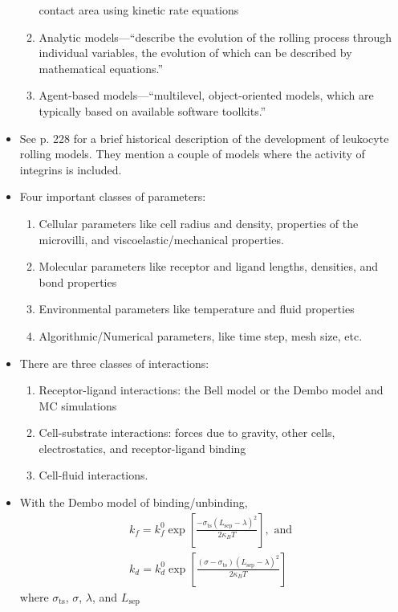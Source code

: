 \documentclass[
10pt, %
letterpaper, %
twocolumn, %
landscape %
]{article}
\begin{document}
\begin{itemize}
\begin{enumerate}
    contact area using kinetic rate equations
  \item Analytic models---``describe the evolution of the rolling
    process through individual variables, the evolution of which can
    be described by mathematical equations.''
  \item Agent-based models---``multilevel, object-oriented models,
    which are typically based on available software toolkits.''
  \end{enumerate}
\item See p. 228 for a brief historical description of the development
  of leukocyte rolling models. They mention a couple of models where
  the activity of integrins is included.
\item Four important classes of parameters:
  \begin{enumerate}
  \item Cellular parameters like cell radius and density, properties
    of the microvilli, and viscoelastic/mechanical properties.
  \item Molecular parameters like receptor and ligand lengths,
    densities, and bond properties
  \item Environmental parameters like temperature and fluid properties
  \item Algorithmic/Numerical parameters, like time step, mesh size, etc.
  \end{enumerate}
\item There are three classes of interactions:
  \begin{enumerate}
  \item Receptor-ligand interactions: the Bell model or the Dembo
    model and MC simulations
  \item Cell-substrate interactions: forces due to gravity, other cells,
    electrostatics, and receptor-ligand binding
  \item Cell-fluid interactions.
  \end{enumerate}
\item With the Dembo model of binding/unbinding, 
  \begin{align*}
    k_f = k_f^0 \exp\left[\frac{-\sigma_\text{ts} \left(L_\text{sep} -
    \lambda\right)^2}{2\kappa_B T}\right], \text{ and } \\
    k_d = k_d^0\exp\left[\frac{(\sigma -
    \sigma_\text{ts})\left(L_\text{sep} - \lambda\right)^2}{2\kappa_B
    T}\right]
  \end{align*}
  where $\sigma_\text{ts}$, $\sigma$, $\lambda$, and $L_\text{sep}$

\end{itemize}
\end{document}
